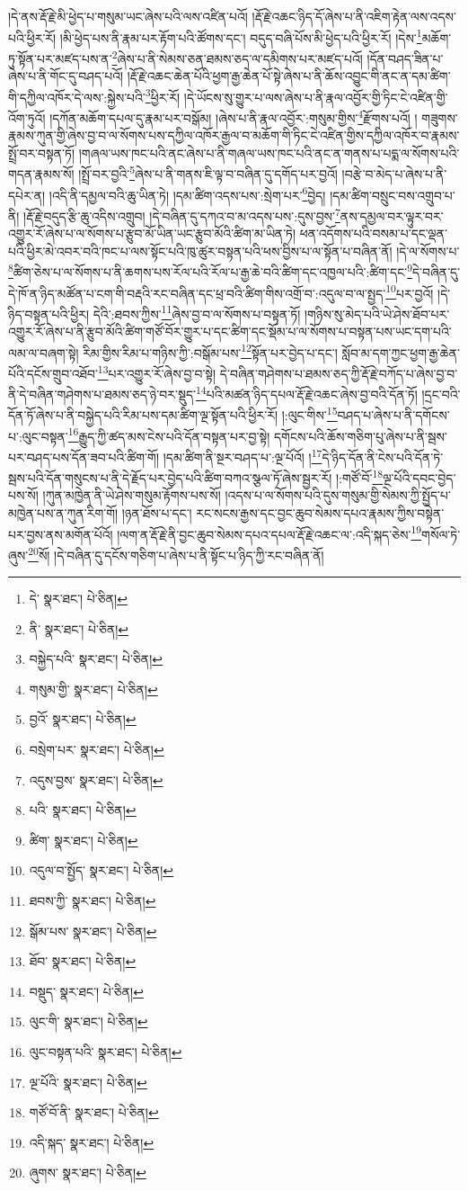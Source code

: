 །དེ་ནས་རྡོ་རྗེ་མི་ཕྱེད་པ་གསུམ་ཡང་ཞེས་པའི་ལས་འཛིན་པའོ། །རྡོ་རྗེ་འཆང་ཉིད་དོ་ཞེས་པ་ནི་འཇིག་རྟེན་ལས་འདས་པའི་ཕྱིར་རོ། །མི་ཕྱེད་པས་ནི་རྣམ་པར་རྟོག་པའི་ཚོགས་དང་། བདུད་བཞི་པོས་མི་ཕྱེད་པའི་ཕྱིར་རོ། །དེས་\footnote{དེ་  སྣར་ཐང་།  པེ་ཅིན། }མཆོག་ཏུ་སྟོན་པར་མཛད་པས་ན་\footnote{ནི་  སྣར་ཐང་།  པེ་ཅིན། }ཞེས་པ་ནི་སེམས་ཅན་ཐམས་ཅད་ལ་དམིགས་པར་མཛད་པའོ། །དོན་བཤད་ཟིན་པ་ཞེས་པ་ནི་གོང་དུ་བཤད་པའོ། །རྡོ་རྗེ་འཆང་ཆེན་པོའི་ཕྱག་རྒྱ་ཆེན་པོ་སྟེ་ཞེས་པ་ནི་ཆོས་འབྱུང་གི་ནང་ན་དམ་ཚིག་གི་དཀྱིལ་འཁོར་དེ་ལས་:སྐྱེས་པའི་\footnote{བསྐྱེད་པའི་  སྣར་ཐང་།  པེ་ཅིན། }ཕྱིར་རོ། །དེ་ཡོངས་སུ་གྱུར་པ་ལས་ཞེས་པ་ནི་རྣལ་འབྱོར་གྱི་ཏིང་ངེ་འཛིན་གྱི་འོག་ཏུའོ། །དཀོན་མཆོག་དཔལ་དུ་རྣམ་པར་བསྒོམ། །ཞེས་པ་ནི་རྣལ་འབྱོར་:གསུམ་གྱིས་\footnote{གསུམ་གྱི་  སྣར་ཐང་།  པེ་ཅིན། }རྫོགས་པའོ། །
གཟུགས་རྣམས་ཀུན་གྱི་ཞེས་བྱ་བ་ལ་སོགས་པས་དཀྱིལ་འཁོར་རྒྱལ་བ་མཆོག་གི་ཏིང་ངེ་འཛིན་གྱིས་དཀྱིལ་འཁོར་བ་རྣམས་སྤྲོ་བར་བསྟན་ཏོ། །གཞལ་ཡས་ཁང་པའི་ནང་ཞེས་པ་ནི་གཞལ་ཡས་ཁང་པའི་ནང་ན་གནས་པ་པདྨ་ལ་སོགས་པའི་གདན་རྣམས་སོ། །སྤྲོ་བར་བྱའི་\footnote{བྱའོ་  སྣར་ཐང་།  པེ་ཅིན། }ཞེས་པ་ནི་གནས་ཇི་ལྟ་བ་བཞིན་དུ་དགོད་པར་བྱའོ། །བརྩེ་བ་མེད་པ་ཞེས་པ་ནི་དཔེར་ན། །འདི་ནི་དམྱལ་བའི་ཆུ་ཡིན་ཏེ། །དམ་ཚིག་འདས་པས་:སྲེག་པར་\footnote{བསྲེག་པར་  སྣར་ཐང་།  པེ་ཅིན། }བྱེད། །དམ་ཚིག་བསྲུང་བས་འགྲུབ་པ་ནི། །རྡོ་རྗེ་བདུད་རྩི་ཆུ་འདིས་འགྲུབ། །དེ་བཞིན་དུ་དཀའ་བ་མ་འདས་པས་:དུས་བྱས་\footnote{འདུས་བྱས་  སྣར་ཐང་།  པེ་ཅིན། }ནས་དམྱལ་བར་ལྟུར་བར་འགྱུར་རོ་ཞེས་པ་ལ་སོགས་པ་རྩུབ་མོ་ཡིན་ཡང་རྩུབ་མོའི་ཚིག་མ་ཡིན་ཏེ། ཕན་འདོགས་པའི་བསམ་པ་དང་ལྡན་པའི་ཕྱིར་མེ་འབར་བའི་ཁང་པ་ལས་སྟོང་པའི་ཁུ་ཚུར་བསྟན་པའི་ཕས་བྱིས་པ་ལ་སྟོན་པ་བཞིན་ནོ། །དེ་ལ་སོགས་པ་\footnote{པའི་  སྣར་ཐང་།  པེ་ཅིན། }ཚིག་ཅེས་པ་ལ་སོགས་པ་ནི་ཆགས་པས་རོལ་པའི་རོལ་པ་རྒྱ་ཆེ་བའི་ཚིག་དང་འཁྱལ་པའི་:ཚིག་དང་\footnote{ཚིག་  སྣར་ཐང་།  པེ་ཅིན། }དེ་བཞིན་དུ་དེ་ཁོ་ན་ཉིད་མཚོན་པ་ངག་གི་བརྡའི་རང་བཞིན་དང་ཕྲ་བའི་ཚིག་གིས་འགྲོ་བ་:འདུལ་བ་ལ་སྤྱད་\footnote{འདུལ་བ་སྤྱོད་  སྣར་ཐང་།  པེ་ཅིན། }པར་བྱའོ། །དེ་ཉིད་བསྟན་པའི་ཕྱིར། དེའི་:ཐབས་ཀྱིས་\footnote{ཐབས་ཀྱི་  སྣར་ཐང་།  པེ་ཅིན། }ཞེས་བྱ་བ་ལ་སོགས་པ་བསྟན་ཏོ། །གཉིས་སུ་མེད་པའི་ཡེ་ཤེས་ཐོབ་པར་འགྱུར་རོ་ཞེས་པ་ནི་རྩུབ་མོའི་ཚིག་གཙོ་བོར་གྱུར་པ་དང་ཚིག་དང་སྡོམ་པ་ལ་སོགས་པ་བསྟན་པས་ཡང་དག་པའི་ལམ་ལ་བཞག་སྟེ། རིམ་གྱིས་རིམ་པ་གཉིས་ཀྱི་:བསྒོམ་པས་\footnote{སྒོམ་པས་  སྣར་ཐང་།  པེ་ཅིན། }སྟོན་པར་བྱེད་པ་དང་། སློབ་མ་དག་ཀྱང་ཕྱག་རྒྱ་ཆེན་པོའི་དངོས་གྲུབ་འཐོབ་\footnote{ཐོབ་  སྣར་ཐང་།  པེ་ཅིན། }པར་འགྱུར་རོ་ཞེས་བྱ་བ་སྟེ། དེ་བཞིན་གཤེགས་པ་ཐམས་ཅད་ཀྱི་རྡོ་རྗེ་བཀོད་པ་ཞེས་བྱ་བ་ནི་དེ་བཞིན་གཤེགས་པ་ཐམས་ཅད་ཉེ་བར་སྡུད་\footnote{བསྡུད་  སྣར་ཐང་།  པེ་ཅིན། }པའི་མཚན་ཉིད་དཔལ་རྡོ་རྗེ་འཆང་ཞེས་བྱ་བའི་དོན་ཏོ། །དྲང་བའི་དོན་ཏོ་ཞེས་པ་ནི་བསྐྱེད་པའི་རིམ་པས་དམ་ཚིག་ལྔ་སྟོན་པའི་ཕྱིར་རོ། །:ལུང་གིས་\footnote{ལུང་གི་  སྣར་ཐང་།  པེ་ཅིན། }བཤད་པ་ཞེས་པ་ནི་དགོངས་པ་:ལུང་བསྟན་\footnote{ལུང་བསྟན་པའི་  སྣར་ཐང་།  པེ་ཅིན། }རྒྱུད་ཀྱི་ཚད་མས་ངེས་པའི་དོན་བསྟན་པར་བྱ་སྟེ། དགོངས་པའི་ཆོས་གཅིག་པུ་ཞེས་པ་ནི་སྦས་པར་བཤད་པས་དོན་ཟབ་པའི་ཚིག་གོ། །དམ་ཚིག་ནི་སྔར་བཤད་པ་:ལྔ་པོའོ། །\footnote{ལྔ་པོའི་  སྣར་ཐང་།  པེ་ཅིན། }དེ་ཉིད་དོན་ནི་ངེས་པའི་དོན་ཏེ་སྦས་པའི་དོན་གསུངས་པ་ནི་དེ་རྗོད་པར་བྱེད་པའི་ཚིག་བཀའ་སྩལ་ཏོ་ཞེས་སྦྱར་རོ། །:གཙོ་བོ་\footnote{གཙོ་བོ་ནི་  སྣར་ཐང་།  པེ་ཅིན། }ལྔ་པོའི་དབང་བྱེད་པས་སོ། །ཀུན་མཁྱེན་ནི་ཡེ་ཤེས་གསུམ་རྟོགས་པས་སོ། །འདས་པ་ལ་སོགས་པའི་དུས་གསུམ་གྱི་སེམས་ཀྱི་སྤྱོད་པ་མཁྱེན་པས་ན་ཀུན་རིག་གོ། །ཉན་ཐོས་པ་དང་། རང་སངས་རྒྱས་དང་བྱང་ཆུབ་སེམས་དཔའ་རྣམས་ཀྱིས་བསྟེན་པར་བྱས་ནས་མགོན་པོའོ། །ལག་ན་རྡོ་རྗེ་ནི་བྱང་ཆུབ་སེམས་དཔའ་དཔལ་རྡོ་རྗེ་འཆང་ལ་:འདི་སྐད་ཅེས་\footnote{འདི་སྐད་  སྣར་ཐང་།  པེ་ཅིན། }གསོལ་ཏེ་ཞུས་\footnote{ཞུགས་  སྣར་ཐང་།  པེ་ཅིན། }སོ། །དེ་བཞིན་དུ་དངོས་གཅིག་པ་ཞེས་པ་ནི་སྟོང་པ་ཉིད་ཀྱི་རང་བཞིན་ནོ། 